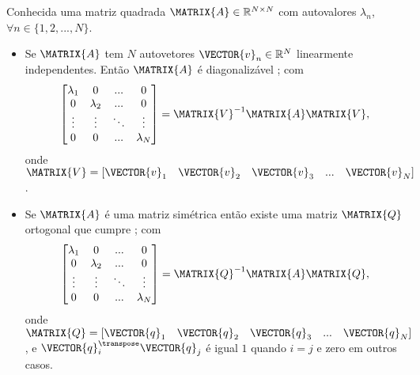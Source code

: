 \begin{theorem}\label{theo:diagonalization1}
Conhecida uma matriz quadrada $\MATRIX{A} \in \mathbb{R}^{N \times N}$ com
autovalores $\lambda_n$, $\forall n \in \{1, 2, ..., N\}$.
\begin{itemize}
\item Se $\MATRIX{A}$ tem $N$  autovetores $\VECTOR{v}_n \in \mathbb{R}^{N}$  linearmente independentes.
Então $\MATRIX{A}$ é diagonalizável \cite[pp. 159]{golub2013matrix};
com
\begin{equation}
\begin{bmatrix}
\lambda_1 & 0         & ...    & 0 \\
0         & \lambda_2 & ...    & 0 \\
\vdots    & \vdots    & \ddots & \vdots \\
0         & 0         & ...    & \lambda_N
\end{bmatrix}
=\MATRIX{V}^{-1}\MATRIX{A}\MATRIX{V},
\end{equation}
onde $\MATRIX{V}=\left[\VECTOR{v}_1\quad \VECTOR{v}_2\quad \VECTOR{v}_3\quad ...\quad \VECTOR{v}_N\right]$.

\item Se $\MATRIX{A}$ é uma matriz simétrica então
existe uma matriz $\MATRIX{Q}$ ortogonal que cumpre \cite[pp. 67, 440]{golub2013matrix};
com
\begin{equation}
\begin{bmatrix}
\lambda_1 & 0         & ...    & 0 \\
0         & \lambda_2 & ...    & 0 \\
\vdots    & \vdots    & \ddots & \vdots \\
0         & 0         & ...    & \lambda_N
\end{bmatrix}
=\MATRIX{Q}^{-1}\MATRIX{A}\MATRIX{Q},
\end{equation}
onde $\MATRIX{Q}=\left[\VECTOR{q}_1\quad \VECTOR{q}_2\quad \VECTOR{q}_3\quad ...\quad \VECTOR{q}_N\right]$,
e $\VECTOR{q}_i^{\transpose}\VECTOR{q}_j$ é igual $1$ quando $i=j$ e zero em outros casos.
\end{itemize}
\end{theorem}
